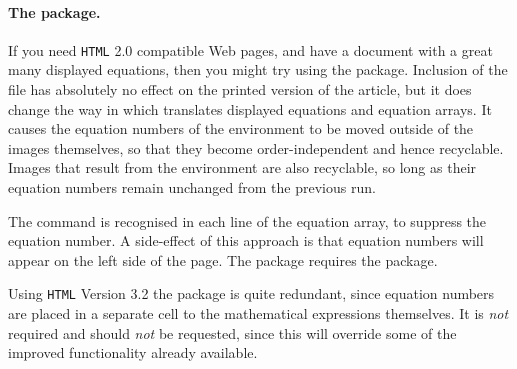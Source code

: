 %
%
%
\html{\\}%
\paragraph*{The  package.}
%
If you need \texttt{HTML} 2.0 compatible Web pages,
and have a document with a great many displayed equations, 
then you might try using the  package.  
Inclusion of the  file has absolutely
no effect on the printed version of the article, 
but it does change the way in which \latextohtml{} translates
displayed equations and equation arrays.  
It causes the equation numbers of the 
environment to be moved outside of the images themselves, 
so that they become order-independent and hence recyclable.  
Images that result from the  environment are also recyclable,
so long as their equation numbers remain unchanged from the previous run.  

%
%
\html{\\}%
The  command is recognised 
in each line of the equation array, to suppress the equation number.
A side-effect of this approach is that equation numbers will
appear on the left side of the page.
The  package requires the  package.%

\smallskip\noindent
Using \texttt{HTML} Version 3.2 the  package is quite redundant,
since equation numbers are placed in a separate  cell
to the mathematical expressions themselves.
It is \emph{not} required and should \emph{not} be requested, since this will
override some of the improved functionality already available.




